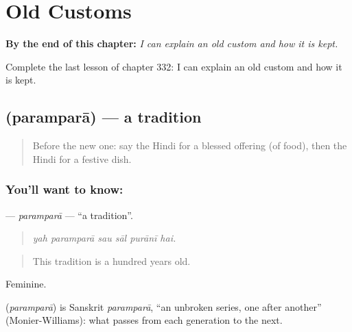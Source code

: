
\chapter{Old Customs}
\label{ch:hi-old-customs}

\begin{chapteropening}
\textbf{By the end of this chapter:} \emph{I can explain an old custom and how it is kept.}

Complete the last lesson of chapter 332: I can explain an old custom and how it is kept.
\end{chapteropening}

\section[\texorpdfstring{\hi{परंपरा} (paramparā)}{परंपरा (paramparā)}]{ (paramparā) — a tradition}

\label{lesson:HI-C332-parampara}



\begin{quote}
Before the new one: say the Hindi for a blessed offering (of food), then the Hindi for a festive dish.
\end{quote}

\subsection*{You'll want to know: }
\textbf{} — \emph{paramparā} — \textquotedblleft{}a tradition\textquotedblright{}.

\begin{quote}
     
\end{quote}

\begin{quote}
\emph{yah paramparā sau sāl purānī hai.}
\end{quote}

\begin{quote}
This tradition is a hundred years old.
\end{quote}

Feminine.

\begin{cousinweb}
\textbf{} (\emph{paramparā}) is Sanskrit \emph{paramparā}, \textquotedblleft{}an unbroken series, one after another\textquotedblright{} (Monier-Williams): what passes from each generation to the next.
\end{cousinweb}


